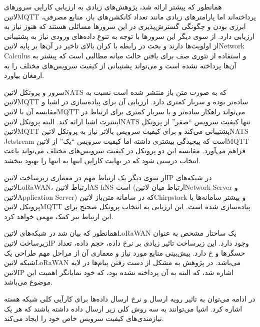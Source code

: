 همانطور که پیشتر ارائه شد، پژوهش‌های زیادی به ارزیابی کارایی سرورهای ‌لاتین{MQTT} پرداخته‌اند اما پارامترهای زیادی مانند تعداد کانکشن‌های باز،
منابع مصرفی، ابرزی بودن و چگونگی گسترش‌پذیری در این سرورها مسائلی هستند که هنوز نیاز به ارزیابی دارد.
از سوی دیگر این سرورها با توجه به تنوع داده‌های ورودی نیاز به پشتیبانی
از اولویت‌ها دارند و بحث در رابطه با کران بالای تاخیر در آن‌ها بر پایه ‌لاتین{Network Calculus}
و استفاده از تئوری صف برای یافتن حالت میانه مطالبی است که پیشتر به آن‌ها پرداخته نشده است و می‌تواند پشتیبانی
از کیفیت سرویس‌های مختلف را به ارمغان بیاورد.

سرور و پروتکل ‌لاتین{NATS} که به صورت متن باز منتشر شده است نسبت به ‌لاتین{MQTT} ساده‌تر بوده و سربار کمتری دارد. ارزیابی آن
برای پیاده‌سازی در اشیا و مقایسه آن با ‌لاتین{MQTT} می‌تواند راهکار ساده‌تر و با سربار کمتری برای ارتباط در اینتنرت اشیا ارائه کند.
البته پروتکل ‌لاتین{NATS} تنها کیفیت سرویس ``صفر'' از پروتکل ‌لاتین{MQTT} پشتیبانی می‌کند و برای کیفیت سرویس بالاتر نیاز به
پروتکل ‌لاتین{NATS Jetstream} است که پیچیدگی بیشتری داشته اما کیفیت سرویس ``یک'' از ‌لاتین{MQTT} فراهم می‌آورد.
مقایسه این دو پروتکل در کیفیت سرویس‌های مختلف می‌تواند باعث انتخاب درستی شود که در نهایت کارایی انتها به انتها را بهبود ببخشد.

از سوی دیگر یک ارتباط مهم در معماری زیرساخت ‌لاتین{IP} در شبکه‌های ‌لاتین{LoRaWAN}،
ارتباط ‌لاتین{AS-hNS} است (ارتباط میان ‌لاتین{Network Server} و ‌لاتین{Application Server})
که در سامانه متن‌باز ‌لاتین{Chirpstack} و بیشتر سامانه‌ها با پروتکل ‌لاتین{MQTT} پیاده‌سازی شده است.
این ارزیابی به انتخاب پروتکل صحیح برای این ارتباط نیز کمک مهمی خواهد کرد.


همانطور که بیان شد در شبکه‌های ‌لاتین{LoRaWAN} یک ساختار مشخص به عنوان زیرساخت ‌لاتین{IP} وجود دارد.
این زیرساخت تاثیر زیادی بر نرخ داده، حجم داده، تعداد حسگرها و ‌خ دارد. پیش‌بینی منابع مورد نیاز و معماری آن از مراحل مهم طراحی یک شبکه ‌لاتین{LoRaWAN} می‌باشد.
در پژوهش  به مشکل از دست رفتن پیام‌ها در لایه ‌لاتین{IP} اشاره شد، که البته به آن پرداخته نشده بود، که خود نمایانگر اهمیت این موضوع می‌باشد.

در ادامه می‌توان به تاثیر رویه ارسال و نرخ ارسال داده‌ها برای کارآیی کلی شبکه هسته اشاره کرد.
اشیا می‌توانند به سه روش کلی زیر ارسال داده داشته باشند که هر یک نیازمندی‌های کیفیت سرویس خاص خود را ایجاد می‌کند.


